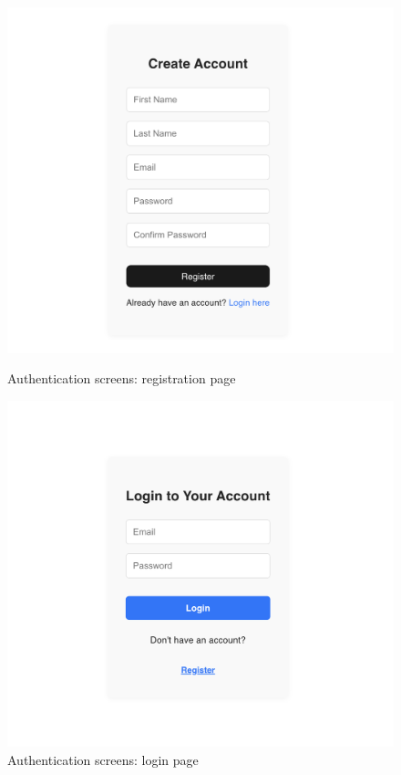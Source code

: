 \begin{figure}[!h]
    \centering
    \begin{minipage}{0.48\linewidth}
        \centering
        \includegraphics[width=1\textwidth]{chapters/chapter_03/page/auth/register-page}
        \caption{Authentication screens: registration page}
        \label{fig:registration-wireframes}
    \end{minipage}
    \hfil
    \begin{minipage}{0.48\linewidth}
        \centering
        \includegraphics[width=1\textwidth]{chapters/chapter_03/page/auth/login-page}
        \caption{Authentication screens: login page}
        \label{fig:login-wireframes}
    \end{minipage}
\end{figure}


